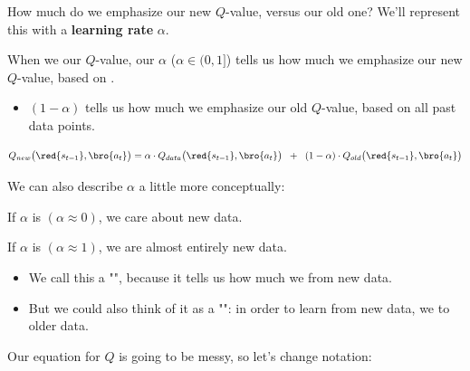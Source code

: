         How much do we emphasize our new $Q$-value, versus our old one? We'll represent this with a \textbf{learning rate} $\alpha$.\\

        \begin{definition}
            When we  our $Q$-value, our  $\alpha$ ($\alpha \in (0,1]$) tells us how much we emphasize our new $Q$-value, based on .

            \begin{itemize}
                \item $(1-\alpha)$ tells us how much we emphasize our old $Q$-value, based on all past data points.
            \end{itemize}

            \begin{equation*}
                Q_{new}\big(\red{s_{t-1}},\bro{a_t} \big) = 
                \alpha \cdot Q_{data}\big(\red{s_{t-1}},\bro{a_t} \big) 
                \;\;+\;\; 
                (1-\alpha) \cdot Q_{old}\big(\red{s_{t-1}},\bro{a_t} \big)
            \end{equation*}
        \end{definition}

        We can also describe $\alpha$ a little more conceptually:\\

        \begin{concept}
            If $\alpha$ is  $(\alpha \approx 0)$, we care  about new data.

            If $\alpha$ is  $(\alpha \approx 1)$, we are almost entirely  new data.

            \subsecdiv

            \begin{itemize}
                \item We call this a "", because it tells us how much we  from new data.
                \item But we could also think of it as a "": in order to learn from new data, we  to older data.
            \end{itemize}
        \end{concept}

        Our equation for $Q$ is going to be messy, so let's change notation:\\

